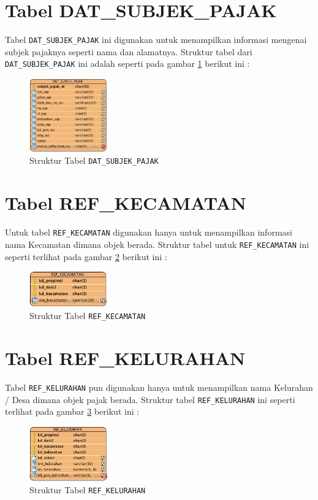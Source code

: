 \section{Tabel DAT\_SUBJEK\_PAJAK}

Tabel \texttt{DAT\_SUBJEK\_PAJAK} ini digunakan untuk menampilkan informasi mengenai subjek pajaknya seperti nama dan alamatnya. Struktur tabel dari \texttt{DAT\_SUBJEK\_PAJAK} ini adalah seperti pada gambar \ref{fig:tab-dat-sp} berikut ini :

\begin{figure}[H]
	\centering
	\includegraphics[width=0.3\textwidth]{./resources/struktur-tabel-dat-sp}
	\caption{Struktur Tabel \texttt{DAT\_SUBJEK\_PAJAK}}
	\label{fig:tab-dat-sp}
\end{figure}

\section{Tabel REF\_KECAMATAN}

Untuk tabel \texttt{REF\_KECAMATAN} digunakan hanya untuk menampilkan informasi nama Kecamatan dimana objek berada. Struktur tabel untuk \texttt{REF\_KECAMATAN} ini seperti terlihat pada gambar \ref{fig:tab-ref-kec} berikut ini :

\begin{figure}[H]
	\centering
	\includegraphics[width=0.3\textwidth]{./resources/struktur-tabel-ref-kec}
	\caption{Struktur Tabel \texttt{REF\_KECAMATAN}}
	\label{fig:tab-ref-kec}
\end{figure}

\section{Tabel REF\_KELURAHAN}

Tabel \texttt{REF\_KELURAHAN} pun digunakan hanya untuk menampilkan nama Kelurahan / Desa dimana objek pajak berada. Struktur tabel \texttt{REF\_KELURAHAN} ini seperti terlihat pada gambar \ref{fig:tab-ref-kel} berikut ini :

\begin{figure}[H]
	\centering
	\includegraphics[width=0.3\textwidth]{./resources/struktur-tabel-ref-kel}
	\caption{Struktur Tabel \texttt{REF\_KELURAHAN}}
	\label{fig:tab-ref-kel}
\end{figure}


